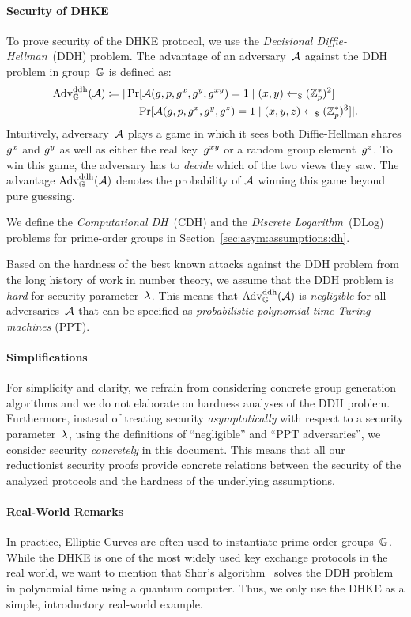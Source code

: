 \paragraph{Security of DHKE}
To prove security of the DHKE protocol, we use the \emph{Decisional Diffie-Hellman}~(DDH) problem.
The advantage of an adversary~$\mathcal{A}$ against the DDH problem in group~$\mathbb{G}$ is defined as:
\begin{align*}
    \mathrm{Adv}_{\mathbb{G}}^{\mathrm{ddh}}(\mathcal{A})\coloneqq|&\Pr[\mathcal{A}(g,p,g^x,g^y,g^{xy})=1\mid (x,y)\gets_\$(\mathbb{Z}_p^*)^2]\\
    &-\Pr[\mathcal{A}(g,p,g^x,g^y,g^z)=1\mid (x,y,z)\gets_\$(\mathbb{Z}_p^*)^3]|\text{.}
\end{align*}
Intuitively, adversary~$\mathcal{A}$ plays a game in which it sees both Diffie-Hellman shares $g^x$ and $g^y$ as well as either the real key~$g^{xy}$ or a random group element~$g^z$.
To win this game, the adversary has to \emph{decide} which of the two views they saw.
The advantage $\mathrm{Adv}_{\mathbb{G}}^{\mathrm{ddh}}(\mathcal{A})$ denotes the probability of $\mathcal{A}$ winning this game beyond pure guessing.

We define the \emph{Computational DH}~(CDH) and the \emph{Discrete Logarithm}~(DLog) problems for prime-order groups in Section~\ref{sec:asym:assumptions:dh}.

Based on the hardness of the best known attacks against the DDH problem from the long history of work in number theory, we assume that the DDH problem is \emph{hard} for security parameter~$\lambda$.
This means that $\mathrm{Adv}_{\mathbb{G}}^{\mathrm{ddh}}(\mathcal{A})$ is \emph{negligible} for all adversaries~$\mathcal{A}$ that can be specified as \emph{probabilistic polynomial-time Turing machines} (PPT).

\paragraph{Simplifications}
For simplicity and clarity, we refrain from considering concrete group generation algorithms and we do not elaborate on hardness analyses of the DDH problem.
Furthermore, instead of treating security \emph{asymptotically} with respect to a security parameter~$\lambda$, using the definitions of ``negligible'' and ``PPT adversaries'', we consider security \emph{concretely} in this document.
This means that all our reductionist security proofs provide concrete relations between the security of the analyzed protocols and the hardness of the underlying assumptions.

\paragraph{Real-World Remarks}
In practice, Elliptic Curves are often used to instantiate prime-order groups~$\mathbb{G}$.
While the DHKE is one of the most widely used key exchange protocols in the real world, we want to mention that Shor's algorithm~\cite{FOCS:Shor94} solves the DDH problem in polynomial time using a quantum computer.
Thus, we only use the DHKE as a simple, introductory real-world example.

